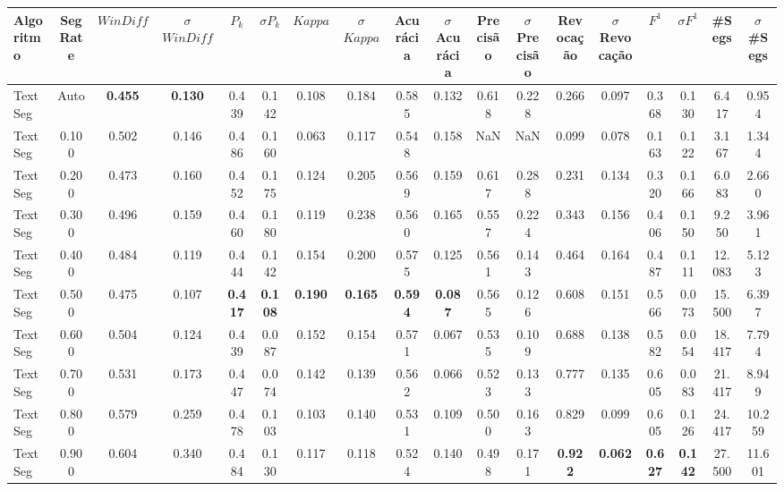 \documentclass{article}
\begin{document}
\tiny\begin{longtable}[c]{|l|c|c|c|c|c|c|c|c|c|c|c|c|c|c|c|c|c|} 
\hline 
Algoritmo & Seg Rate & $WinDiff$ & $\sigma$$WinDiff$ & $P_k$ & $\sigma$$P_k$ & $Kappa$ & $\sigma$$Kappa$ & Acurácia & $\sigma$Acurácia & Precisão & $\sigma$Precisão & Revocação & $\sigma$Revocação & $F^1$ & $\sigma$$F^1$ & \#Segs & $\sigma$\#Segs\\ \hline 
TextSeg & Auto & \cellcolor{gray!20} \textbf{0.455} & \cellcolor{gray!20} \textbf{0.130} & 0.439 & 0.142 & 0.108 & 0.184 & 0.585 & 0.132 & 0.618 & 0.228 & 0.266 & 0.097 & 0.368 & 0.130 & 6.417 & 0.954  \\ \hline 
 TextSeg & 0.100 & 0.502 & 0.146 & 0.486 & 0.160 & 0.063 & 0.117 & 0.548 & 0.158 & NaN & NaN & 0.099 & 0.078 & 0.163 & 0.122 & 3.167 & 1.344  \\ \hline 
 TextSeg & 0.200 & 0.473 & 0.160 & 0.452 & 0.175 & 0.124 & 0.205 & 0.569 & 0.159 & 0.617 & 0.288 & 0.231 & 0.134 & 0.320 & 0.166 & 6.083 & 2.660  \\ \hline 
 TextSeg & 0.300 & 0.496 & 0.159 & 0.460 & 0.180 & 0.119 & 0.238 & 0.560 & 0.165 & 0.557 & 0.224 & 0.343 & 0.156 & 0.406 & 0.150 & 9.250 & 3.961  \\ \hline 
 TextSeg & 0.400 & 0.484 & 0.119 & 0.444 & 0.142 & 0.154 & 0.200 & 0.575 & 0.125 & 0.561 & 0.143 & 0.464 & 0.164 & 0.487 & 0.111 & 12.083 & 5.123  \\ \hline 
 TextSeg & 0.500 & 0.475 & 0.107 & \cellcolor{gray!20} \textbf{0.417} & \cellcolor{gray!20} \textbf{0.108} & \cellcolor{gray!20} \textbf{0.190} & \cellcolor{gray!20} \textbf{0.165} & \cellcolor{gray!20} \textbf{0.594} & \cellcolor{gray!20} \textbf{0.087} & 0.565 & 0.126 & 0.608 & 0.151 & 0.566 & 0.073 & 15.500 & 6.397  \\ \hline 
 TextSeg & 0.600 & 0.504 & 0.124 & 0.439 & 0.087 & 0.152 & 0.154 & 0.571 & 0.067 & 0.535 & 0.109 & 0.688 & 0.138 & 0.582 & 0.054 & 18.417 & 7.794  \\ \hline 
 TextSeg & 0.700 & 0.531 & 0.173 & 0.447 & 0.074 & 0.142 & 0.139 & 0.562 & 0.066 & 0.523 & 0.133 & 0.777 & 0.135 & 0.605 & 0.083 & 21.417 & 8.949  \\ \hline 
 TextSeg & 0.800 & 0.579 & 0.259 & 0.478 & 0.103 & 0.103 & 0.140 & 0.531 & 0.109 & 0.500 & 0.163 & 0.829 & 0.099 & 0.605 & 0.126 & 24.417 & 10.259  \\ \hline 
 TextSeg & 0.900 & 0.604 & 0.340 & 0.484 & 0.130 & 0.117 & 0.118 & 0.524 & 0.140 & 0.498 & 0.171 & \cellcolor{gray!20} \textbf{0.922} & \cellcolor{gray!20} \textbf{0.062} & \cellcolor{gray!20} \textbf{0.627} & \cellcolor{gray!20} \textbf{0.142} & 27.500 & 11.601  \\ \hline 
 \end{longtable} 
\end{document}
